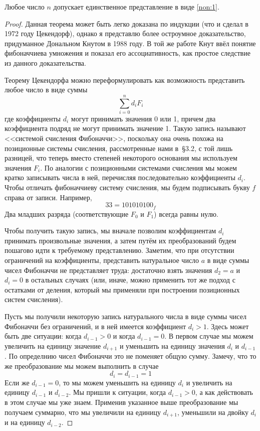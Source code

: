 \begin{thm}
Любое число $n$ допускает единственное представление в виде \eqref{non:1}.
\end{thm}
\begin{proof}
Данная теорема может быть легко доказана по индукции (что и сделал в 1972 году Цекендорф), однако я представлю более остроумное доказательство, придуманное Дональном Кнутом в 1988 году. В той же работе Кнут ввёл понятие фибоначчиева умножения и показал его ассоциативность, как простое следствие из данного доказательства.

Теорему Цекендорфа можно переформулировать как возможность представить любое число в виде суммы
$$\sum_{i=0}^n d_iF_i$$
где коэффициенты $d_i$ могут принимать значения 0 или 1, причем два коэффициента подряд не могут принимать значение 1. Такую запись называют <<системой счисления Фибоначчи>>, поскольку она очень похожа на позиционные системы счисления, рассмотренные нами в~\S3.2, с той лишь разницей, что теперь вместо степеней некоторого основания мы используем значения $F_i$. По аналогии с позиционными системами счисления мы можем кратко записывать числа в ней, перечисляя последовательно коэффициенты $d_i$. Чтобы отличать фибоначчиеву систему счисления, мы будем подписывать букву $f$ справа от записи. Например,
$$33 = 101010100_f$$
Два младших разряда (соответствующие $F_0$ и $F_1$) всегда равны нулю.

Чтобы получить такую запись, мы вначале позволим коэффициентам $d_i$ принимать произвольные значения, а затем путём их преобразований будем пошагово идти к требуемому представлению. Заметим, что при отсутствии ограничений на коэффициенты, представить натуральное число $a$ в виде суммы чисел Фибоначчи не представляет труда: достаточно взять значения $d_2 = a$ и $d_i = 0$ в остальных случаях (или, иначе, можно применить тот же подход с остатками от деления, который мы применяли при построении позиционных систем счисления).

Пусть мы получили некоторую запись натурального числа в виде суммы чисел Фибоначчи без ограничений, и в ней имеется коэффициент $d_i > 1$. Здесь может быть две ситуации: когда $d_{i-1}> 0$ и когда $d_{i-1} = 0$. В первом случае мы можем увеличить на единицу значение $d_{i+1}$ и уменьшить на единицу значения $d_i$ и $d_{i-1}$. По определнию чисел Фибоначчи это не поменяет общую сумму. Замечу, что то же преобразование мы можем выполнить в случае
$$d_i = d_{i-1} = 1$$
Если же $d_{i-1} = 0$, то мы можем уменьшить на единицу $d_i$ и увеличить на единицу $d_{i-1}$ и $d_{i-2}$. Мы пришли к ситуации, когда $d_{i-1} > 0$, а как действовать в этом случае мы уже знаем. Применив указанное выше преобразование мы получаем суммарно, что мы увеличили на единицу $d_{i+1}$, уменьшили на двойку $d_i$ и на единицу $d_{i-2}$.


\end{proof}
